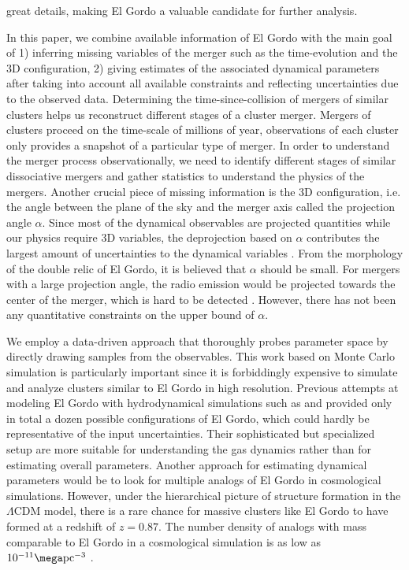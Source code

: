 great details, making El Gordo a valuable candidate for further analysis.
\par 
In this paper, we combine available information of El Gordo with the main
goal of 1) inferring missing variables of the merger
such as the time-evolution and the 3D configuration, 2) giving estimates of
the associated dynamical parameters after taking into account all available
constraints and reflecting uncertainties due to the observed data.
Determining the time-since-collision of mergers of similar clusters helps
us reconstruct different stages of a cluster merger.
Mergers of clusters proceed on the time-scale of millions of year,
observations of each cluster only provides a snapshot of a particular type
of merger. In order to understand the merger process observationally, 
we need to identify different stages of similar dissociative mergers and
gather statistics to understand the physics of the mergers.  
Another crucial piece of missing information is the 3D
configuration, i.e. the angle between the plane of the sky and the merger
axis called the projection angle $\alpha$. Since most of the dynamical
observables are projected quantities while our physics require 3D
variables, the deprojection based on $\alpha$ contributes the
largest amount of uncertainties to the dynamical variables .
From the morphology of the double relic of El Gordo, it is believed that
$\alpha$ should be small. For  mergers with a
large projection angle, the radio emission would be projected towards the
center of the merger, which is hard to be detected \citep{Vazza11}.
However, there has not been any quantitative constraints on the upper bound of $\alpha$.  
\par 
We employ a data-driven approach that thoroughly probes parameter
space by directly drawing samples from the observables. 
This work based on Monte Carlo simulation is particularly important since
it is forbiddingly expensive to simulate and analyze clusters similar to El
Gordo in high resolution. Previous attempts at modeling El Gordo with hydrodynamical
simulations such as \cite{Donnert13} and \cite{Molnar14} provided only in
total a dozen possible configurations of El Gordo, which could hardly be
representative of the input uncertainties. Their sophisticated but
specialized setup are more suitable for understanding the gas dynamics
rather than for estimating overall parameters. Another approach for
estimating dynamical parameters
would be to look for multiple analogs of El Gordo in cosmological
simulations.  However, under the hierarchical picture
of structure formation in the $\Lambda$CDM model, there is a rare chance
for massive clusters like El Gordo to have formed at a redshift of $z = 0.87$.  
The number density of analogs with mass comparable to El Gordo in a
cosmological simulation is as low as $10^{-11} \mega\text{pc}^{-3}$ .  
\par

